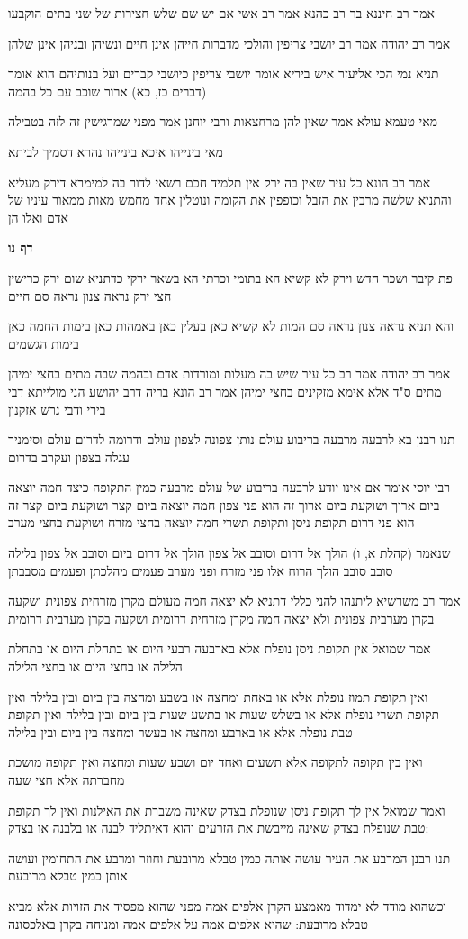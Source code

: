 \documentclass[12pt, openany]{book}
\newcommand{\sethebfont}{
\fontsize{10.5pt}{21.0pt} \selectfont
}
\newcommand{\textblock}[1]{
{\sethebfont #1\\}	
}
\newcommand{\sectname}{}
\newcommand{\newsection}[1]{
	\addcontentsline{toc}{section}{#1}
	\renewcommand{\sectname}{#1}	
	\vspace{-\baselineskip}
	\begin{center}
		\textbf{%
\fontsize{16pt}{16pt}\selectfont
			#1}
	\end{center}
	\vspace{-\baselineskip}
	\nopagebreak
}
\begin{document}
\textblock{אמר רב חיננא בר רב כהנא אמר רב אשי אם יש שם שלש חצירות של שני בתים הוקבעו}
\textblock{אמר רב יהודה אמר רב יושבי צריפין והולכי מדברות חייהן אינן חיים ונשיהן ובניהן אינן שלהן}
\textblock{תניא נמי הכי אליעזר איש ביריא אומר יושבי צריפין כיושבי קברים ועל בנותיהם הוא אומר (דברים כז, כא) ארור שוכב עם כל בהמה}
\textblock{מאי טעמא עולא אמר שאין להן מרחצאות ורבי יוחנן אמר מפני שמרגישין זה לזה בטבילה}
\textblock{מאי בינייהו איכא בינייהו נהרא דסמיך לביתא}
\textblock{אמר רב הונא כל עיר שאין בה ירק אין תלמיד חכם רשאי לדור בה למימרא דירק מעליא והתניא שלשה מרבין את הזבל וכופפין את הקומה ונוטלין אחד מחמש מאות ממאור עיניו של אדם ואלו הן}
\newsection{דף נו}
\textblock{פת קיבר ושכר חדש וירק לא קשיא הא בתומי וכרתי הא בשאר ירקי כדתניא שום ירק כרישין חצי ירק נראה צנון נראה סם חיים}
\textblock{והא תניא נראה צנון נראה סם המות לא קשיא כאן בעלין כאן באמהות כאן בימות החמה כאן בימות הגשמים}
\textblock{אמר רב יהודה אמר רב כל עיר שיש בה מעלות ומורדות אדם ובהמה שבה מתים בחצי ימיהן מתים ס"ד אלא אימא מזקינים בחצי ימיהן אמר רב הונא בריה דרב יהושע הני מולייתא דבי בירי ודבי נרש אזקנון}
\textblock{תנו רבנן בא לרבעה מרבעה בריבוע עולם נותן צפונה לצפון עולם ודרומה לדרום עולם וסימניך עגלה בצפון ועקרב בדרום}
\textblock{רבי יוסי אומר אם אינו יודע לרבעה בריבוע של עולם מרבעה כמין התקופה כיצד חמה יוצאה ביום ארוך ושוקעת ביום ארוך זה הוא פני צפון חמה יוצאה ביום קצר ושוקעת ביום קצר זה הוא פני דרום תקופת ניסן ותקופת תשרי חמה יוצאה בחצי מזרח ושוקעת בחצי מערב}
\textblock{שנאמר (קהלת א, ו) הולך אל דרום וסובב אל צפון הולך אל דרום ביום וסובב אל צפון בלילה סובב סובב הולך הרוח אלו פני מזרח ופני מערב פעמים מהלכתן ופעמים מסבבתן}
\textblock{אמר רב משרשיא ליתנהו להני כללי דתניא לא יצאה חמה מעולם מקרן מזרחית צפונית ושקעה בקרן מערבית צפונית ולא יצאה חמה מקרן מזרחית דרומית ושקעה בקרן מערבית דרומית}
\textblock{אמר שמואל אין תקופת ניסן נופלת אלא בארבעה רבעי היום או בתחלת היום או בתחלת הלילה או בחצי היום או בחצי הלילה}
\textblock{ואין תקופת תמוז נופלת אלא או באחת ומחצה או בשבע ומחצה בין ביום ובין בלילה ואין תקופת תשרי נופלת אלא או בשלש שעות או בתשע שעות בין ביום ובין בלילה ואין תקופת טבת נופלת אלא או בארבע ומחצה או בעשר ומחצה בין ביום ובין בלילה}
\textblock{ואין בין תקופה לתקופה אלא תשעים ואחד יום ושבע שעות ומחצה ואין תקופה מושכת מחברתה אלא חצי שעה}
\textblock{ואמר שמואל אין לך תקופת ניסן שנופלת בצדק שאינה משברת את האילנות ואין לך תקופת טבת שנופלת בצדק שאינה מייבשת את הזרעים והוא דאיתליד לבנה או בלבנה או בצדק:}
\textblock{תנו רבנן המרבע את העיר עושה אותה כמין טבלא מרובעת וחוזר ומרבע את התחומין ועושה אותן כמין טבלא מרובעת}
\textblock{וכשהוא מודד לא ימדוד מאמצע הקרן אלפים אמה מפני שהוא מפסיד את הזויות אלא מביא טבלא מרובעת: שהיא אלפים אמה על אלפים אמה ומניחה בקרן באלכסונה}
\end{document}

